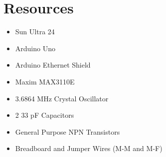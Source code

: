 \documentclass{amsart}
\begin{document}
\section{Resources}
\begin{itemize}
\item Sun Ultra 24
\item Arduino Uno
\item Arduino Ethernet Shield
\item Maxim MAX3110E
\item 3.6864 MHz Crystal Oscillator
\item 2 33 pF Capacitors
\item General Purpose NPN Transistors
\item Breadboard and Jumper Wires (M-M and M-F)
\end{itemize}


\end{document}
